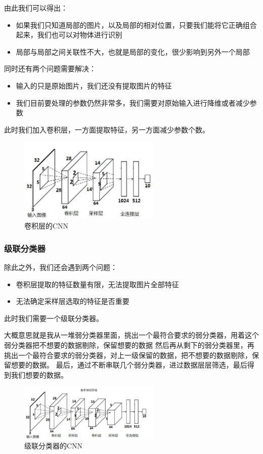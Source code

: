 \documentclass[UTF8]{ctexart}
\begin{document}
由此我们可以得出：
\begin{itemize}
	\item 如果我们只知道局部的图片，以及局部的相对位置，只要我们能将它正确组合起来，我们也可以对物体进行识别
	\item 局部与局部之间关联性不大，也就是局部的变化，很少影响到另外一个局部
\end{itemize}
同时还有两个问题需要解决：
\begin{itemize}
	\item 输入的只是原始图片，我们还没有提取图片的特征
	\item 我们目前要处理的参数仍然非常多，我们需要对原始输入进行降维或者减少参数
\end{itemize}
此时我们加入卷积层，一方面提取特征，另一方面减少参数个数。
\begin{figure}[htb]
	\centering
	\includegraphics[width=0.6\textwidth]{figures/cnn5.jpg}
	\caption{卷积层的CNN}
	\label{cnn5}
\end{figure}
\subsubsection{级联分类器}
除此之外，我们还会遇到两个问题：
\begin{itemize}
	\item 卷积层提取的特征数量有限，无法提取图片全部特征
	\item 无法确定采样层选取的特征是否重要
\end{itemize}
\par 此时我们需要一个级联分类器。
\par 大概意思就是我从一堆弱分类器里面，挑出一个最符合要求的弱分类器，用着这个弱分类器把不想要的数据剔除，保留想要的数据
然后再从剩下的弱分类器里，再挑出一个最符合要求的弱分类器，对上一级保留的数据，把不想要的数据剔除，保留想要的数据。
最后，通过不断串联几个弱分类器，进过数据层层筛选，最后得到我们想要的数据。
\begin{figure}[htb]
	\centering
	\includegraphics[width=0.6\textwidth]{figures/cnn6.jpg}
	\caption{级联分类器的CNN}
	\label{cnn6}
\end{figure}
\end{document}
